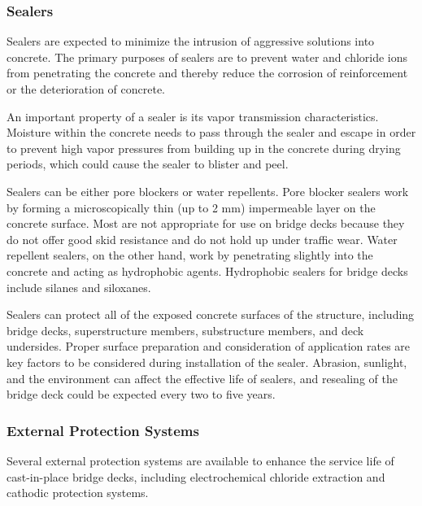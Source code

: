 \subsubsection{Sealers}
Sealers are expected to minimize the intrusion of aggressive solutions into concrete. The primary purposes of
sealers are to prevent water and chloride ions from penetrating the concrete and thereby reduce the corrosion of
reinforcement or the deterioration of concrete.

An important property of a sealer is its vapor transmission characteristics. Moisture within the concrete needs to
pass through the sealer and escape in order to prevent high vapor pressures from building up in the concrete during
drying periods, which could cause the sealer to blister and peel.

Sealers can be either pore blockers or water repellents. Pore blocker sealers work by forming a microscopically
thin (up to 2 mm) impermeable layer on the concrete surface. Most are not appropriate for use on bridge decks
because they do not offer good skid resistance and do not hold up under traffic wear. Water repellent sealers, on the
other hand, work by penetrating slightly into the concrete and acting as hydrophobic agents. Hydrophobic sealers for
bridge decks include silanes and siloxanes.

Sealers can protect all of the exposed concrete surfaces of the structure, including bridge decks, superstructure
members, substructure members, and deck undersides. Proper surface preparation and consideration of application
rates are key factors to be considered during installation of the sealer. Abrasion, sunlight, and the environment can
affect the effective life of sealers, and resealing of the bridge deck could be expected every two to five years.


\subsubsection{External Protection Systems}
Several external protection systems are available to enhance the service life of cast-in-place bridge decks,
including electrochemical chloride extraction and cathodic protection systems.


